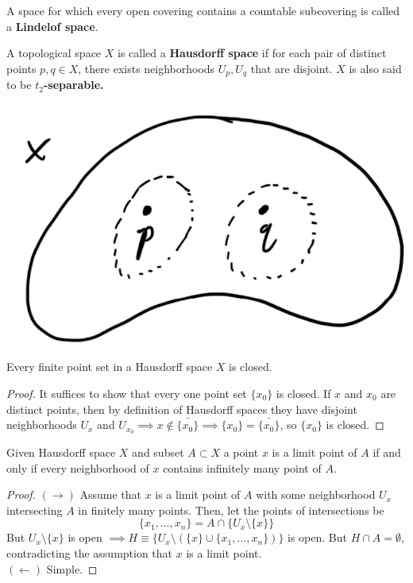     \begin{definition}
    A space for which every open covering contains a countable subcovering is called a \textbf{Lindelof space}. 
    \end{definition}

    \begin{definition}
    A topological space $X$ is called a \textbf{Hausdorff space} if for each pair of distinct points $p, q \in X$, there exists neighborhoods $U_p, U_q$ that are disjoint. $X$ is also said to be \textbf{$t_2$-separable.}
    \begin{center}
        \includegraphics[scale=0.35]{img/Hausdorff_Space_Separability.PNG}
    \end{center}
    \end{definition}

    \begin{theorem}
    Every finite point set in a Hausdorff space $X$ is closed. 
    \end{theorem}
    \begin{proof}
    It suffices to show that every one point set $\{x_0\}$ is closed. If $x$ and $x_0$ are distinct points, then by definition of Hausdorff spaces they have disjoint neighborhoods $U_x$ and $U_{x_0} \implies x \not\in \bar{\{x_0\}} \implies \{x_0\} = \bar{\{x_0\}}$, so $\{x_0\}$ is closed. 
    \end{proof}

    \begin{theorem}
    Given Hausdorff space $X$ and subset $A \subset X$ a point $x$ is a limit point of $A$ if and only if every neighborhood of $x$ contains infinitely many point of $A$. 
    \end{theorem}
    \begin{proof}
    $(\rightarrow)$ Assume that $x$ is a limit point of $A$ with some neighborhood $U_x$ intersecting $A$ in finitely many points. Then, let the points of intersections be 
    \[\{x_1, ..., x_n\} = A \cap \{U_x \setminus \{x\} \} \]
    But $U_x \setminus \{x\}$ is open $\implies H \equiv \{U_x \setminus ( \{x\} \cup \{x_1, ..., x_n\})\}$ is open. But $H \cap A = \emptyset$, contradicting the assumption that $x$ is a limit point. \\
    $(\leftarrow)$ Simple. 
    \end{proof}

